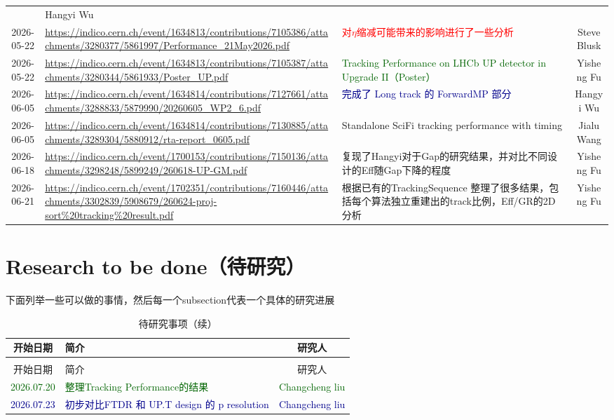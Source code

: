\documentclass[UTF8]{article}
\newcommand{\blue}[1]{\textcolor{darkblue}{#1}}
\newcommand{\red}[1]{\textcolor{red}{#1}}
\newcommand{\green}[1]{\textcolor{darkgreen}{#1}}
\begin{document}
\begin{longtable}{c>{\centering\arraybackslash}m{4cm}m{6cm}c}
        & Hangyi Wu \\
    2026-05-22 & \tiny\url{https://indico.cern.ch/event/1634813/contributions/7105386/attachments/3280377/5861997/Performance_21May2026.pdf}
        & \red{对$\eta$缩减可能带来的影响进行了一些分析}
        & Steve Blusk \\
    2026-05-22 & \tiny\url{https://indico.cern.ch/event/1634813/contributions/7105387/attachments/3280344/5861933/Poster_UP.pdf}
        & \green{Tracking Performance on LHCb UP detector in Upgrade II（Poster）}
        & Yisheng Fu \\
    2026-06-05 & \tiny\url{https://indico.cern.ch/event/1634814/contributions/7127661/attachments/3288833/5879990/20260605_WP2_6.pdf}
        & \blue{完成了 Long track 的 ForwardMP 部分}
        & Hangyi Wu \\
    2026-06-05 & \tiny\url{https://indico.cern.ch/event/1634814/contributions/7130885/attachments/3289304/5880912/rta-report_0605.pdf}
        & Standalone SciFi tracking performance with timing
        & Jialu Wang \\
    2026-06-18 & \tiny\url{https://indico.cern.ch/event/1700153/contributions/7150136/attachments/3298248/5899249/260618-UP-GM.pdf}
        & 复现了Hangyi对于Gap的研究结果，并对比不同设计的Eff随Gap下降的程度
        & Yisheng Fu \\
    2026-06-21 & \tiny\url{https://indico.cern.ch/event/1702351/contributions/7160446/attachments/3302839/5908679/260624-proj-sort%20tracking%20result.pdf}
        & 根据已有的TrackingSequence 整理了很多结果，包括每个算法独立重建出的track比例，Eff/GR的2D分析
        & Yisheng Fu \\
    \bottomrule
  \end{longtable}


\section{Research to be done（待研究）}

下面列举一些可以做的事情，然后每一个subsection代表一个具体的研究进展



\renewcommand{\arraystretch}{1.6}
\begin{longtable}{c>{\centering\arraybackslash}m{8cm}c}
    \caption{待研究事项}
    \label{tab:research-todo} \\
    \toprule
    开始日期 & 简介 & 研究人 \\
    \midrule
    \endfirsthead
    \caption{待研究事项（续）} \\
    \toprule
    开始日期 & 简介 & 研究人 \\
    \midrule
    \endhead
    \bottomrule
    \endfoot
    \green{2026.07.20} & \green{整理Tracking Performance的结果} & \green{Changcheng liu}\\
    \blue{2026.07.23} & \blue{初步对比FTDR 和 UP.T design 的 p resolution} & \blue{Changcheng liu}\\
    \bottomrule
  \end{longtable}
\end{document}
